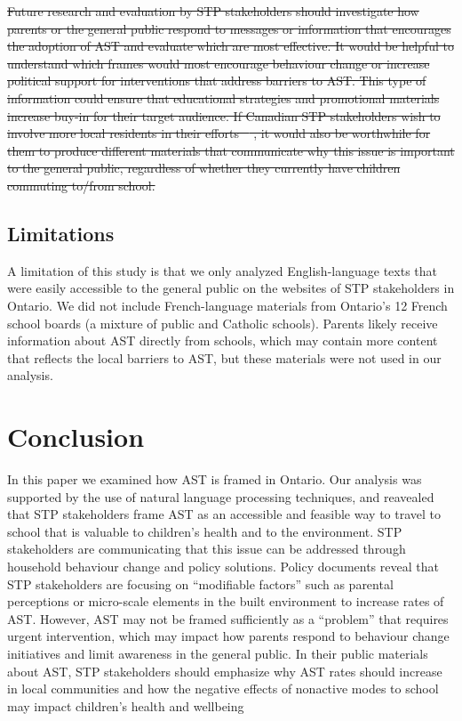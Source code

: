 \documentclass[preprint, 3p,
authoryear]{elsarticle} %
\providecommand{\DIFaddtex}[1]{{\protect\color{blue}\uwave{#1}}} %
\providecommand{\DIFdeltex}[1]{{\protect\color{red}\sout{#1}}}                      %
\providecommand{\DIFaddbegin}{} %
\providecommand{\DIFdelbegin}{} %
\providecommand{\DIFdelend}{} %
\providecommand{\DIFadd}[1]{\texorpdfstring{\DIFaddtex{#1}}{#1}} %
\providecommand{\DIFdel}[1]{\texorpdfstring{\DIFdeltex{#1}}{}} %
\newcommand{\DIFscaledelfig}{0.5}
\newlength{\DIFdelgraphicswidth} %
\newlength{\DIFdelgraphicsheight} %
\newcommand{\DIFaddincludegraphics}[2][]{{\color{blue}\fbox{\DIFOincludegraphics[#1]{#2}}}} %
\newcommand{\DIFdelincludegraphics}[2][]{%
\sbox{\DIFdelgraphicsbox}{\DIFOincludegraphics[#1]{#2}}%
\settoboxwidth{\DIFdelgraphicswidth}{\DIFdelgraphicsbox} %
\settoboxtotalheight{\DIFdelgraphicsheight}{\DIFdelgraphicsbox} %
\scalebox{\DIFscaledelfig}{%
\parbox[b]{\DIFdelgraphicswidth}{\usebox{\DIFdelgraphicsbox}\\[-\baselineskip] \rule{\DIFdelgraphicswidth}{0em}}\llap{\resizebox{\DIFdelgraphicswidth}{\DIFdelgraphicsheight}{%
\setlength{\unitlength}{\DIFdelgraphicswidth}%
\begin{picture}(1,1)%
\thicklines\linethickness{2pt} %
{\color[rgb]{1,0,0}\put(0,0){\framebox(1,1){}}}%
{\color[rgb]{1,0,0}\put(0,0){\line( 1,1){1}}}%
{\color[rgb]{1,0,0}\put(0,1){\line(1,-1){1}}}%
\end{picture}%
}\hspace*{3pt}}} %
} %
\DeclareRobustCommand{\DIFaddbegin}{\DIFOaddbegin \let\includegraphics\DIFaddincludegraphics} %
\DeclareRobustCommand{\DIFdelbegin}{\DIFOdelbegin \let\includegraphics\DIFdelincludegraphics} %
\DeclareRobustCommand{\DIFdelend}{\DIFOaddend \let\includegraphics\DIFOincludegraphics} %
\begin{document}
\DIFdelbegin \DIFdel{Future research and evaluation by STP stakeholders should investigate
how parents or the general public respond to messages or information
that encourages the adoption of AST and evaluate which are most
effective. It would be helpful to understand which frames would most
encourage behaviour change or increase political support for
interventions that address barriers to AST. This type of information
could ensure that educational strategies and promotional materials
increase buy-in for their target audience. If Canadian STP stakeholders
wish to involve more local residents in their efforts
\mbox{%
\citep{buttazzoniSupportingActiveSchool2018}}\hspace{0pt}%
, it would also be
worthwhile for them to produce different materials that communicate why
this issue is important to the general public, regardless of whether
they currently have children commuting to/from school.
}%

\DIFdelend \hypertarget{limitations}{%
\subsection{Limitations}\label{limitations}}

A limitation of this study is that we only analyzed English-language
texts that were easily accessible to the general public on the websites
of STP stakeholders in Ontario. We did not include French-language
materials from Ontario's 12 French school boards (a mixture of public
and Catholic schools). Parents likely receive information about AST
directly from schools, which may contain more content that reflects the
local barriers to AST, but these materials were not used in our
analysis.

\hypertarget{conclusion}{%
\section{Conclusion}\label{conclusion}}

In this paper we examined how AST is framed in Ontario. Our analysis was
supported by the use of natural language processing techniques, and
reavealed that STP stakeholders frame AST as an accessible and feasible
way to travel to school that is valuable to children's health and to the
environment. STP stakeholders are communicating that this issue can be
addressed through household behaviour change and policy solutions.
Policy documents reveal that STP stakeholders are focusing on
``modifiable factors'' such as parental perceptions or micro-scale
elements in the built environment to increase rates of AST. However, AST
may not be framed sufficiently as a ``problem'' that requires urgent
intervention, which may impact how parents respond to behaviour change
initiatives and limit awareness in the general public. In their public
materials about AST, STP stakeholders should emphasize why AST rates
should increase in local communities and how the negative effects of
nonactive modes to school may impact children's health and wellbeing\DIFaddbegin \DIFadd{.
}
\end{document}
